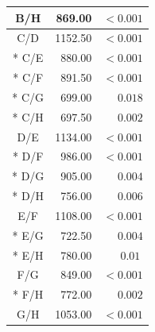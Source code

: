 \documentclass[12pt]{scrartcl}
\begin{document}
\begin{center}
\begin{longtable}{crc}
      B/H   &  869.00   & $< 0.001$\sym{***}                       \\
      \midrule
      C/D   & 1152.50   & $< 0.001$\sym{***}                       \\*
      C/E   &  880.00   & $< 0.001$\sym{***}                       \\*
      C/F   &  891.50   & $< 0.001$\sym{***}                       \\*
      C/G   &  699.00   & $\phantom{< }0.018$\sym{*\phantom{**}}   \\*
      C/H   &  697.50   & $\phantom{< }0.002$\sym{**\phantom{*}}   \\
      \midrule
      D/E   & 1134.00   & $< 0.001$\sym{***}                       \\*
      D/F   &  986.00   & $< 0.001$\sym{***}                       \\*
      D/G   &  905.00   & $\phantom{< }0.004$\sym{**\phantom{*}}   \\*
      D/H   &  756.00   & $\phantom{< }0.006$\sym{**\phantom{*}}   \\
      \midrule
      E/F   & 1108.00   & $< 0.001$\sym{***}                       \\*
      E/G   &  722.50   & $\phantom{< }0.004$\sym{**\phantom{*}}   \\*
      E/H   &  780.00   & $\phantom{< }0.01$\sym{**\phantom{*}}    \\
      \midrule
      F/G   &  849.00   & $< 0.001$\sym{***}                       \\*
      F/H   &  772.00   & $\phantom{< }0.002$\sym{**\phantom{*}}   \\
      \midrule
      G/H   & 1053.00   & $< 0.001$\sym{***}                       \\
   \end{longtable}
\end{center}

\clearpage
\printbibliography
\end{document}
